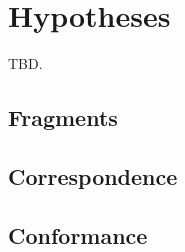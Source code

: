 \chapter{Hypotheses}
\label{chapter:Hypotheses}
TBD.
\section{Fragments}
\section{Correspondence}
\section{Conformance}
